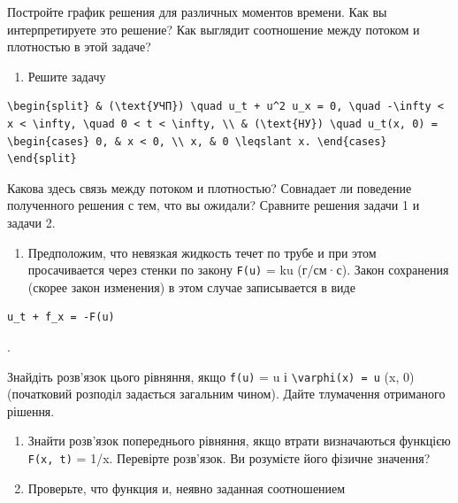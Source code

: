 \documentclass[
  ukrainian,
]{article}
\providecommand{\tightlist}{%
  \setlength{\itemsep}{0pt}\setlength{\parskip}{0pt}}
\begin{document}
Постройте график решения для различных моментов времени. Как вы
интерпретируете это решение? Как выглядит соотношение между потоком и
плотностью в этой задаче?

\begin{enumerate}
\def\labelenumi{\arabic{enumi}.}
\setcounter{enumi}{1}
\tightlist
\item
  Решите задачу
\end{enumerate}

\begin{verbatim}
\begin{split} & (\text{УЧП}) \quad u_t + u^2 u_x = 0, \quad -\infty < x < \infty, \quad 0 < t < \infty, \\ & (\text{НУ}) \quad u_t(x, 0) = \begin{cases} 0, & x < 0, \\ x, & 0 \leqslant x. \end{cases} \end{split}
\end{verbatim}

Какова здесь связь между потоком и плотностью? Совнадает ли поведение
полученного решения с тем, что вы ожидали? Сравните решения задачи 1 и
задачи 2.

\begin{enumerate}
\def\labelenumi{\arabic{enumi}.}
\setcounter{enumi}{2}
\tightlist
\item
  Предположим, что невязкая жидкость течет по трубе и при этом
  просачивается через стенки по закону \texttt{F(u)} = ku (г/см·с).
  Закон сохранения (скорее закон изменения) в этом случае записывается в
  виде
\end{enumerate}

\begin{verbatim}
u_t + f_x = -F(u)
\end{verbatim}

.

Знайдіть розв'язок цього рівняння, якщо \texttt{f(u)} = u і
\texttt{\textbackslash{}varphi(x)\ =\ u} (x, 0) (початковий розподіл
задається загальним чином). Дайте тлумачення отриманого рішення.

\begin{enumerate}
\def\labelenumi{\arabic{enumi}.}
\setcounter{enumi}{3}
\item
  Знайти розв'язок попереднього рівняння, якщо втрати визначаються
  функцією \texttt{F(x,\ t)} = 1/x. Перевірте розв'язок. Ви розумієте
  його фізичне значення?
\item
  Проверьте, что функция и, неявно заданная соотношением
\end{enumerate}
\end{document}
